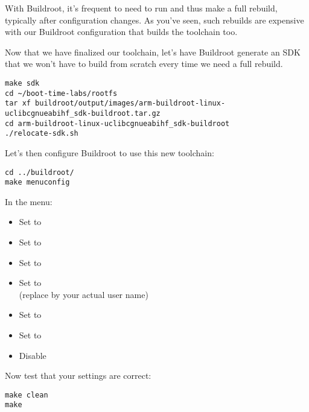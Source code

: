 With Buildroot, it's frequent to need to run  and
thus make a full rebuild, typically after configuration changes.
As you've seen, such rebuilds are expensive with our Buildroot
configuration that builds the toolchain too.

Now that we have finalized our toolchain, let's have Buildroot generate
an SDK that we won't have to build from scratch every time we need a
full rebuild.

\begin{verbatim}
make sdk
cd ~/boot-time-labs/rootfs
tar xf buildroot/output/images/arm-buildroot-linux-uclibcgnueabihf_sdk-buildroot.tar.gz
cd arm-buildroot-linux-uclibcgnueabihf_sdk-buildroot
./relocate-sdk.sh
\end{verbatim}

Let's then configure Buildroot to use this new toolchain:
\begin{verbatim}
cd ../buildroot/
make menuconfig
\end{verbatim}

In the  menu:
\begin{itemize}
\item Set  to 
\item Set  to 
\item Set  to 
\item Set  to\\
      (replace  by your actual user name)
\item Set  to 
\item Set  to 
\item Disable 
\end{itemize}

Now test that your settings are correct:

\begin{verbatim}
make clean
make
\end{verbatim}

